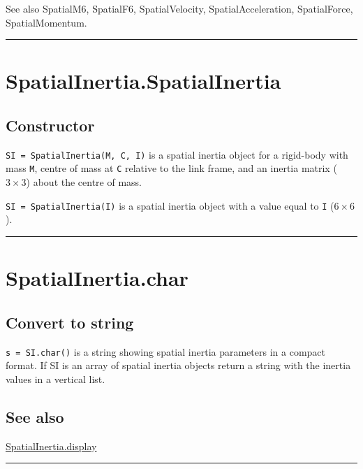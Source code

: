 See also SpatialM6, SpatialF6, SpatialVelocity, SpatialAcceleration, SpatialForce,
SpatialMomentum.

\vspace{1.5ex}\hrule

\hypertarget{SpatialInertia.SpatialInertia}{\section*{SpatialInertia.SpatialInertia}}
\subsection*{Constructor}


\texttt{SI = SpatialInertia(M, C, I)} is a spatial inertia object for a rigid-body
with mass \texttt{M}, centre of mass at \texttt{C} relative to the link frame, and an
inertia matrix ($3 \times 3$) about the centre of mass.



\texttt{SI = SpatialInertia(I)} is a spatial inertia object with a value equal
to \texttt{I} ($6 \times 6$).

\vspace{1.5ex}\hrule

\hypertarget{SpatialInertia.char}{\section*{SpatialInertia.char}}
\subsection*{Convert to string}


\texttt{s = SI.char()} is a string showing spatial inertia parameters in a
compact format.
If SI is an array of spatial inertia objects return a string with the
inertia values in a vertical list.


\subsection*{See also}


\hyperlink{SpatialInertia.display}{\color{blue} SpatialInertia.display}

\vspace{1.5ex}\hrule

